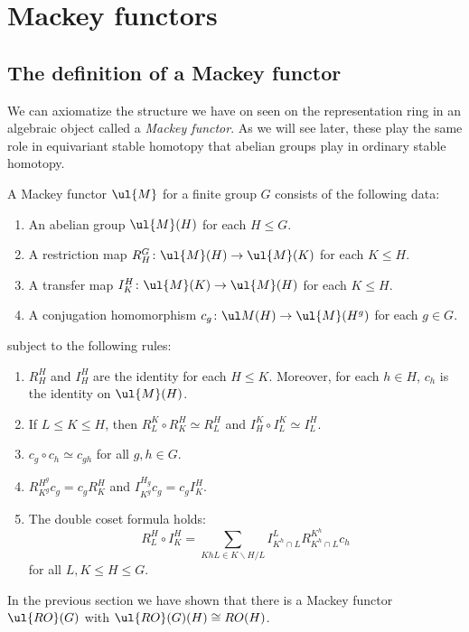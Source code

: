 \documentclass{willowtreebook}
\begin{document}
\chapter{Mackey functors}
\section{The definition of a Mackey functor}
We can axiomatize the structure we have on seen on the representation ring in an algebraic object called a \emph{Mackey functor}. As we will see later, these play the same role in equivariant stable homotopy that abelian groups play in ordinary stable homotopy. 
\begin{definition}
    A Mackey functor $\ul{M}$ for a finite group $G$ consists of the following data:
    \begin{enumerate}[label=(\alph*)]
    \item An abelian group $\ul{M}(H)$ for each $H \le G$. 
    \item A restriction map $R^G_H \colon \ul{M}(H) \to \ul{M}(K)$ for each $K \le H$. 
    \item A transfer map $I_K^H \colon \ul{M}(K) \to \ul{M}(H)$ for each $K \le H$. 
    \item A conjugation homomorphism $c_g \colon \ul M(H) \to \ul{M}(H^g)$  for each $g \in G$. 
    \end{enumerate}
    subject to the following rules:
    \begin{enumerate}[label=(\roman*)]
        \item $R^H_H$ and $I^H_H$ are the identity for each $ H \le K$. Moreover, for each $h \in H$, $c_h$ is the identity on $\ul{M}(H)$. 
        \item If $L \le K \le H$, then $R^K_L \circ R^H_K \simeq R^H_L$ and $I_H^K \circ I_L^K \simeq I_L^H$. 
        \item $c_g \circ c_h \simeq c_{gh}$ for all $g, h \in G$. 
        \item $R_{K^g}^{H^g}c_g = c_gR_K^H$ and $I_{K^g}^{H_g}c_g= c_gI_K^H$.
        \item The double coset formula holds:
        \[
R^{H}_L \circ I_K^H = \sum_{KhL \in K\backslash H/L} I^L_{K^{h}\cap L} R^{K^h}_{K^h \cap L}c_h
        \]
        for all $L,K \le H \le G$. 
    \end{enumerate}
\end{definition}
\begin{example}
    In the previous section we have shown that there is a Mackey functor $\ul{RO}(G)$ with $\ul{RO}(G)(H) \cong RO(H)$. 
\end{example}
\end{document}
